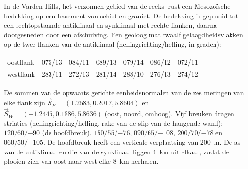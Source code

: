 \begin{problem}
\label{pb:b3:structural-analysis:1}
In de Varden Hills, het verzonnen gebied van de reeks, rust een Mesozoïsche bedekking op een
basement van schist en graniet. De bedekking is geplooid tot een rechtopstaande
antiklinaal en synklinaal met rechte flanken, daarna doorgesneden door een afschuiving. Een
geoloog mat twaalf gelaagdheidsvlakken op de twee flanken van de antiklinaal
(hellingrichting/helling, in graden):

\begin{center}
\small
\begin{tabular}{l|cccccc}
\hline
oostflank & 075/13 & 084/11 & 089/13 & 079/14 & 086/12 & 072/11 \\
westflank & 283/11 & 272/13 & 281/14 & 288/10 & 276/13 & 274/12 \\
\hline
\end{tabular}
\end{center}

De sommen van de opwaarts gerichte eenheidsnormalen van de zes metingen van elke flank zijn
$\vec S_E = (1.2583, 0.2017, 5.8604)$ en $\vec S_W = (-1.2445, 0.1886,
5.8636)$ (oost, noord, omhoog). Vijf breuken dragen striaties (hellingrichting/helling,
rake van de slip van de hangende wand): $120/60/{-90}$ (de hoofdbreuk), $150/55/{-76}$,
$090/65/{-108}$, $200/70/{-78}$ en $060/50/{-105}$. De hoofdbreuk heeft een
verticale verplaatsing van \qty{200}{m}. De as van de antiklinaal en die van de synklinaal liggen \qty{4}{km} uit elkaar,
zodat de plooien zich van oost naar west elke \qty{8}{km} herhalen.


\end{problem}
